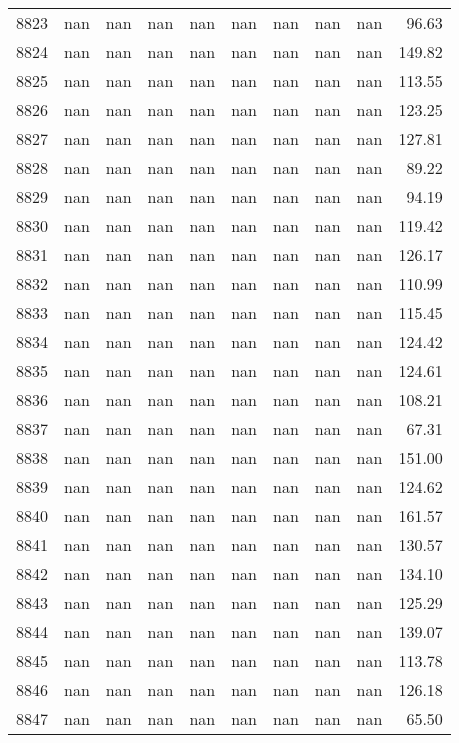 \begin{tabular}{lrrrrrrrrr}
8823 & nan & nan & nan & nan & nan & nan & nan & nan & 96.63 \\
8824 & nan & nan & nan & nan & nan & nan & nan & nan & 149.82 \\
8825 & nan & nan & nan & nan & nan & nan & nan & nan & 113.55 \\
8826 & nan & nan & nan & nan & nan & nan & nan & nan & 123.25 \\
8827 & nan & nan & nan & nan & nan & nan & nan & nan & 127.81 \\
8828 & nan & nan & nan & nan & nan & nan & nan & nan & 89.22 \\
8829 & nan & nan & nan & nan & nan & nan & nan & nan & 94.19 \\
8830 & nan & nan & nan & nan & nan & nan & nan & nan & 119.42 \\
8831 & nan & nan & nan & nan & nan & nan & nan & nan & 126.17 \\
8832 & nan & nan & nan & nan & nan & nan & nan & nan & 110.99 \\
8833 & nan & nan & nan & nan & nan & nan & nan & nan & 115.45 \\
8834 & nan & nan & nan & nan & nan & nan & nan & nan & 124.42 \\
8835 & nan & nan & nan & nan & nan & nan & nan & nan & 124.61 \\
8836 & nan & nan & nan & nan & nan & nan & nan & nan & 108.21 \\
8837 & nan & nan & nan & nan & nan & nan & nan & nan & 67.31 \\
8838 & nan & nan & nan & nan & nan & nan & nan & nan & 151.00 \\
8839 & nan & nan & nan & nan & nan & nan & nan & nan & 124.62 \\
8840 & nan & nan & nan & nan & nan & nan & nan & nan & 161.57 \\
8841 & nan & nan & nan & nan & nan & nan & nan & nan & 130.57 \\
8842 & nan & nan & nan & nan & nan & nan & nan & nan & 134.10 \\
8843 & nan & nan & nan & nan & nan & nan & nan & nan & 125.29 \\
8844 & nan & nan & nan & nan & nan & nan & nan & nan & 139.07 \\
8845 & nan & nan & nan & nan & nan & nan & nan & nan & 113.78 \\
8846 & nan & nan & nan & nan & nan & nan & nan & nan & 126.18 \\
8847 & nan & nan & nan & nan & nan & nan & nan & nan & 65.50 \\

\end{tabular}
